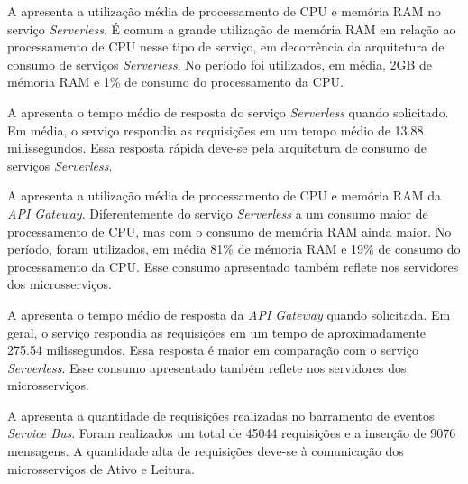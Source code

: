 A  apresenta a utilização média de processamento de CPU e memória RAM no serviço \textit{Serverless}. É comum a grande utilização de memória RAM em relação ao processamento de CPU nesse tipo de serviço, em decorrência da arquitetura de consumo de serviços \textit{Serverless}. No período foi utilizados, em média, 2GB de mémoria RAM e 1\% de consumo do processamento da CPU.


\newpage

A  apresenta o tempo médio de resposta do serviço \textit{Serverless} quando solicitado. Em média, o serviço respondia as requisições em um tempo médio de 13.88 milissegundos. Essa resposta rápida deve-se pela arquitetura de consumo de serviços \textit{Serverless}.


A  apresenta a utilização média de processamento de CPU e memória RAM da \textit{API Gateway}. Diferentemente do serviço \textit{Serverless} a um consumo maior de processamento de CPU, mas com o consumo de memória RAM ainda maior. No período, foram utilizados, em média 81\% de mémoria RAM e 19\% de consumo do processamento da CPU. Esse consumo apresentado também reflete nos servidores dos microsserviços.


A  apresenta o tempo médio de resposta da \textit{API Gateway} quando solicitada. Em geral, o serviço respondia as requisições em um tempo de aproximadamente 275.54 milissegundos. Essa resposta é maior em comparação com o serviço \textit{Serverless}. Esse consumo apresentado também reflete nos servidores dos microsserviços.


\newpage

A  apresenta a quantidade de requisições realizadas no barramento de eventos \textit{Service Bus}. Foram realizados um total de 45044 requisições e a inserção de 9076 mensagens. A quantidade alta de requisições deve-se à comunicação dos microsserviços de Ativo e Leitura.

